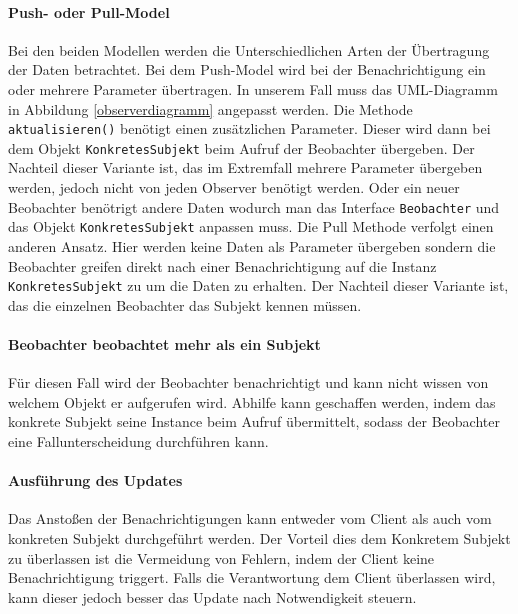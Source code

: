 \paragraph{Push- oder Pull-Model} Bei den beiden Modellen werden die Unterschiedlichen Arten der Übertragung der Daten betrachtet. Bei dem Push-Model wird bei der Benachrichtigung ein oder mehrere Parameter übertragen. In unserem Fall muss das UML-Diagramm in Abbildung \ref{observerdiagramm} angepasst werden. Die Methode \texttt{aktualisieren()} benötigt einen zusätzlichen Parameter. Dieser wird dann bei dem Objekt \texttt{KonkretesSubjekt} beim Aufruf der Beobachter übergeben. Der Nachteil dieser Variante ist, das im Extremfall mehrere Parameter übergeben werden, jedoch nicht von jeden Observer benötigt werden. Oder ein neuer Beobachter benötrigt andere Daten wodurch man das Interface \texttt{Beobachter} und das Objekt \texttt{KonkretesSubjekt} anpassen muss.
Die Pull Methode verfolgt einen anderen Ansatz. Hier werden keine Daten als Parameter übergeben sondern die Beobachter greifen direkt nach einer Benachrichtigung auf die Instanz \texttt{KonkretesSubjekt} zu um die Daten zu erhalten. Der Nachteil dieser Variante ist, das die einzelnen Beobachter das Subjekt kennen müssen.


\paragraph{Beobachter beobachtet mehr als ein Subjekt} Für diesen Fall wird der Beobachter benachrichtigt und kann nicht wissen von welchem Objekt er aufgerufen wird. Abhilfe kann geschaffen werden, indem das konkrete Subjekt seine Instance beim Aufruf übermittelt, sodass der Beobachter eine Fallunterscheidung durchführen kann.

\paragraph{Ausführung des Updates} Das Anstoßen der Benachrichtigungen kann entweder vom Client als auch vom konkreten Subjekt durchgeführt werden. Der Vorteil dies dem Konkretem Subjekt zu überlassen ist die Vermeidung von Fehlern, indem der Client keine Benachrichtigung triggert. Falls die Verantwortung dem Client überlassen wird, kann dieser jedoch besser das Update nach Notwendigkeit steuern.

